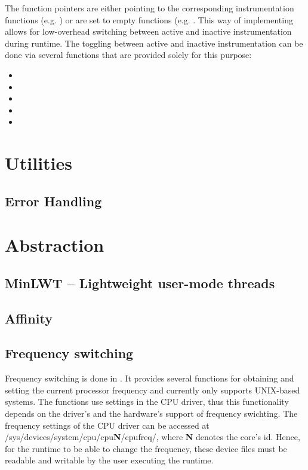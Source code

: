 The function pointers are either pointing to the corresponding instrumentation
functions (e.g. ) or are set to
empty functions (e.g. . This way
of implementing allows for low-overhead switching between active and inactive
instrumentation during runtime. The toggling between active and inactive
instrumentation can be done via several functions that are provided solely for
this purpose:

\begin{itemize} 
	\item {} 
	\item {} 
	\item {} 
	\item {} 
	\item {} 
\end{itemize}


\section{Utilities} 
\subsection{Error Handling} 
\section{Abstraction}
\subsection{MinLWT -- Lightweight user-mode threads} 
\subsection{Affinity}
\subsection{Frequency switching} 

Frequency switching is done in . It provides several functions for obtaining and setting the current processor frequency and currently only supports UNIX-based systems. The functions use settings in the CPU driver, thus this functionality depends on the driver's and the hardware's support of frequency swichting. The frequency settings of the CPU driver can be accessed at /sys/devices/system/cpu/cpu\textbf{N}/cpufreq/, where \textbf{N} denotes the core's id. Hence, for the runtime to be able to change the frequency, these device files must be readable and writable by the user executing the runtime.

